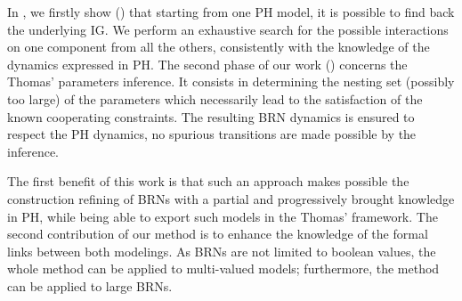 In \cite{FPIMR12-CMSB}, we firstly show () that starting from one PH model, it is possible to find back the underlying IG.
We perform an exhaustive search for the possible interactions on one component from all the
others, consistently with the knowledge of the dynamics expressed in PH.
The second phase of our work () concerns the Thomas' parameters inference.
It consists in determining the nesting set (possibly too large) of the parameters which necessarily
lead to the satisfaction of the known cooperating constraints.
The resulting BRN dynamics is ensured to respect the PH dynamics, \ie no spurious transitions are
made possible by the inference.

The first benefit of this work is that such an approach makes possible the construction refining of BRNs with a partial and progressively brought knowledge in PH, while being able to export such models in the Thomas' framework.
The second contribution of our method is to enhance the knowledge of the formal links between both modelings.
As BRNs are not limited to boolean values, the whole method can be applied to multi-valued models;
furthermore, the method can be applied to large BRNs.

\begin{comment}
\paragraph{Outline.}
\pref{sec:frameworks} recalls the PH and Thomas frameworks;
\pref{sec:infer-IG} defines the IG inference from PH;
\pref{sec:infer-K} details the enumeration of Thomas parametrizations compatible with a PH;
\pref{sec:examples} gives some information about the implementation of the method.
\end{comment}
